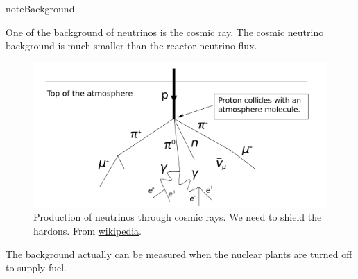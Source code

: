 \documentclass[letterpaper,12pt,english]{sphinxmanual}
\begin{document}
\begin{notice}{note}{Background}

One of the background of neutrinos is the cosmic ray. The cosmic neutrino background is much smaller than the reactor neutrino flux.
\begin{figure}[htbp]
\centering
\capstart

\includegraphics{atmosphericNeutrinos.png}
\caption{Production of neutrinos through cosmic rays. We need to shield the hardons. From \href{https://commons.wikimedia.org/wiki/File:Atmospheric\_Collision.svg}{wikipedia}.}\end{figure}

The background actually can be measured when the nuclear plants are turned off to supply fuel.
\end{notice}
\end{document}
